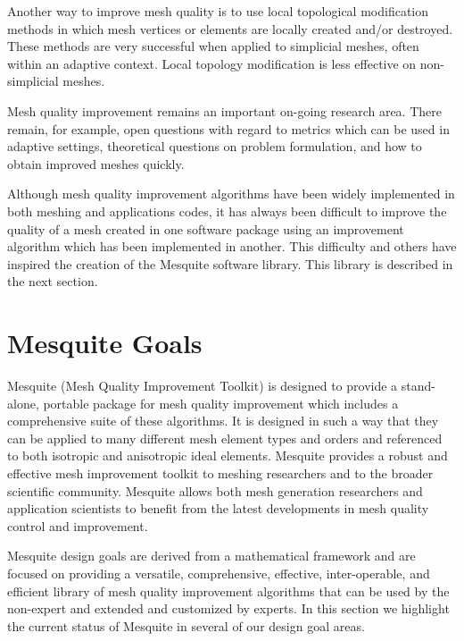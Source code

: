\documentclass[letter]{report}
\begin{document}
Another way to improve mesh quality is to use local topological modification methods in which mesh vertices or elements are locally created and/or destroyed. These methods are very successful when applied to simplicial meshes, often within an adaptive context.  Local topology modification is less effective on non-simplicial meshes. \newline

Mesh quality improvement remains an important on-going research area. 
There remain, for example, open questions with regard to metrics which 
can be used in adaptive settings, theoretical questions on problem 
formulation, and how to obtain improved meshes quickly. \newline

Although mesh quality improvement algorithms have been widely implemented 
in both meshing and applications codes, it has always been difficult to 
improve the quality of a mesh created in one software package using an 
improvement algorithm which has been implemented in another.  This difficulty
and others have inspired the creation of the Mesquite software library. 
This library is described in the next section. \newline


\section{Mesquite Goals}
Mesquite (Mesh Quality Improvement Toolkit) is designed to provide a
stand-alone, portable package for mesh quality improvement which
includes a comprehensive suite of these algorithms.  It is designed in
such a way that they can be applied to many different mesh element
types and orders and referenced to both isotropic and anisotropic
ideal elements.  Mesquite provides a 
robust and effective mesh improvement toolkit to meshing researchers and 
to the broader
scientific community.  Mesquite allows both mesh generation
researchers and application scientists to benefit from the latest
developments in mesh quality control and improvement. \newline

Mesquite design goals are derived from a mathematical framework and
are focused on providing a versatile, comprehensive, effective,
inter-operable, and efficient library of mesh quality improvement
algorithms that can be used by the non-expert and extended and
customized by experts.  In this section we highlight the current
status of Mesquite in several of our design goal areas. \newline
\end{document}
